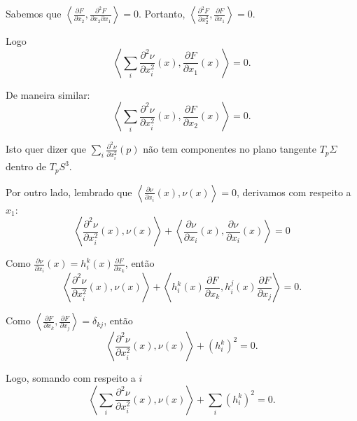 \begin{demonstracao}
	Sabemos que $\left\langle \frac{\partial F}{\partial x_2}, \frac{\partial^2 F}{\partial x_2 \partial x_1} \right\rangle = 0$. Portanto, $\left\langle \frac{\partial^2 F}{\partial x_2^2}, \frac{\partial F}{\partial x_1} \right\rangle = 0$.
	
	Logo
	\begin{equation*}
		\left\langle \sum_i \frac{\partial^2 \nu}{\partial x_i^2}(x), \frac{\partial F}{\partial x_1}(x) \right\rangle = 0.
	\end{equation*}
	
	De maneira similar:
	\begin{equation*}
		\left\langle \sum_i \frac{\partial^2 \nu}{\partial x_i^2}(x), \frac{\partial F}{\partial x_2}(x) \right\rangle = 0.
	\end{equation*}
	
	Isto quer dizer que $\sum_i \frac{\partial^2 \nu}{\partial x_i^2}(p)$ não tem componentes no plano tangente $T_p \Sigma$ dentro de $T_p S^3$.
	
	Por outro lado, lembrado que $\left\langle \frac{\partial \nu}{\partial x_i}(x), \nu(x) \right\rangle = 0$, derivamos com respeito a $x_1$:
	\begin{equation*}
		\left\langle \frac{\partial^2 \nu}{\partial x_i^2}(x), \nu(x) \right\rangle + \left\langle \frac{\partial \nu}{\partial x_i}(x), \frac{\partial \nu}{\partial x_i}(x) \right\rangle = 0
	\end{equation*}
	
	Como $\frac{\partial \nu}{\partial x_i}(x) = h_i^k(x) \frac{\partial F}{\partial x_k}$, então
	\begin{equation*}
		\left\langle \frac{\partial^2 \nu}{\partial x_i^2}(x), \nu(x) \right\rangle + \left\langle h_i^k(x) \frac{\partial F}{\partial x_k}, h_i^j(x) \frac{\partial F}{\partial x_j}  \right\rangle = 0.
	\end{equation*}
	
	Como $\left\langle \frac{\partial F}{\partial x_k}, \frac{\partial F}{\partial x_j} \right\rangle = \delta_{kj}$, então
	\begin{equation*}
		\left\langle \frac{\partial^2 \nu}{\partial x_i^2}(x), \nu(x) \right\rangle + (h_i^k)^2 = 0.
	\end{equation*}
	
	Logo, somando com respeito a $i$
	\begin{equation*}
		\left\langle \sum_i \frac{\partial^2 \nu}{\partial x_i^2}(x), \nu(x) \right\rangle + \sum_i (h_i^k)^2 = 0.
	\end{equation*}
	

\end{demonstracao}
